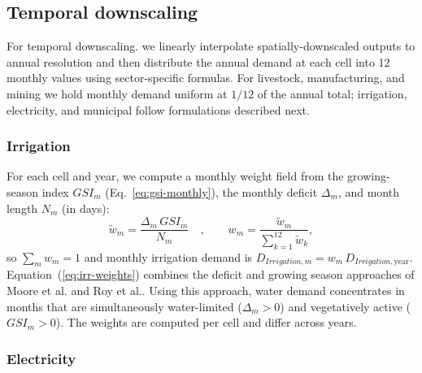 \documentclass[fleqn,10pt]{wlscirep}
\begin{document}
\subsection*{Temporal downscaling}

For temporal downscaling. we linearly interpolate spatially-downscaled outputs to annual resolution and then distribute the annual demand at each cell into 12 monthly values using sector-specific formulas. For livestock, manufacturing, and mining we hold monthly demand uniform at $1/12$ of the annual total; irrigation, electricity, and municipal follow formulations described next.

\subsubsection*{Irrigation}

For each cell and year, we compute a monthly weight field from the growing-season index $GSI_m$ (Eq.~\ref{eq:gsi-monthly}), the monthly deficit $\Delta_m$, and month length $N_m$ (in days):
\begin{equation}
\tilde{w}_m = \frac{\Delta_m \, GSI_m}{N_m}\quad, \qquad w_m = \frac{\tilde{w}_m}{\sum_{k=1}^{12}\tilde{w}_k},
\label{eq:irr-weights}
\end{equation}
so $\sum_m w_m = 1$ and monthly irrigation demand is $D_{Irrigation,m} = w_m \, D_{Irrigation,\mathrm{year}}$. Equation~(\ref{eq:irr-weights}) combines the deficit and growing season approaches of Moore et al.\cite{Moore_2015} and Roy et al.\cite{Roy_2005}. Using this approach, water demand concentrates in months that are simultaneously water-limited ($\Delta_m > 0$) and vegetatively active ($GSI_m > 0$). The weights are computed per cell and differ across years.

\subsubsection*{Electricity}
\end{document}
